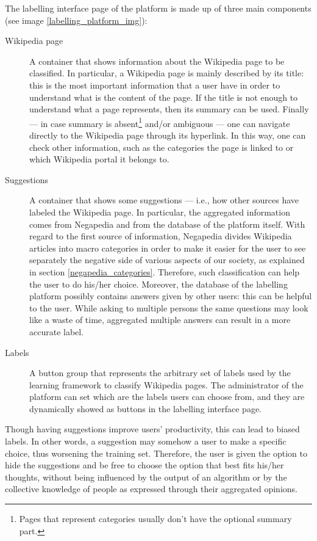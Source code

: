             The labelling interface page of the platform is made up of three main components (see image \ref{labelling_platform_img}):
            \begin{description}
                \item[Wikipedia page] A container that shows information about the Wikipedia page to be classified. In particular, a Wikipedia page is mainly described by its title: this is the most important information that a user have in order to understand what is the content of the page. If the title is not enough to understand what a page represents, then its summary can be used. Finally --- in case summary is absent\footnote{Pages that represent categories usually don't have the optional summary part.} and/or ambiguous --- one can navigate directly to the Wikipedia page through its hyperlink. In this way, one can check other information, such as the categories the page is linked to or which Wikipedia portal it belongs to.
                \item[Suggestions] A container that shows some suggestions --- i.e., how other sources have labeled the Wikipedia page. In particular, the aggregated information comes from Negapedia and from the database of the platform itself. With regard to the first source of information, Negapedia divides Wikipedia articles into macro categories in order to make it easier for the user to see separately the negative side of various aspects of our society, as explained in section \ref{negapedia_categories}. Therefore, such classification can help the user to do his/her choice. Moreover, the database of the labelling platform possibly contains answers given by other users: this can be helpful to the user. While asking to multiple persons the same questions may look like a waste of time, aggregated multiple answers can result in a more accurate label.
                \item[Labels] A button group that represents the arbitrary set of labels used by the learning framework to classify Wikipedia pages. The administrator of the platform can set which are the labels users can choose from, and they are dynamically showed as buttons in the labelling interface page.
            \end{description}
            
            Though having suggestions improve users' productivity, this can lead to biased labels. In other words, a suggestion may somehow  a user to make a specific choice, thus worsening the training set. Therefore, the user is given the option to hide the suggestions and be free to choose the option that best fits his/her thoughts, without being influenced by the output of an algorithm or by the collective knowledge of people as expressed through their aggregated opinions.
